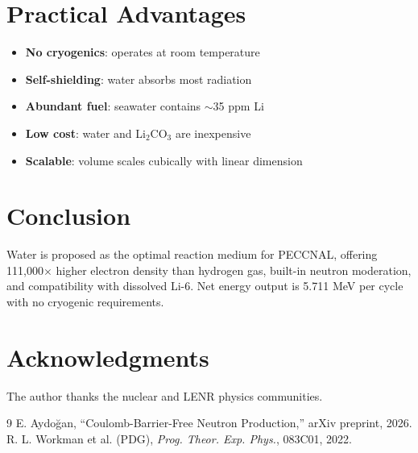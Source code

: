 \documentclass[12pt,a4paper]{article}
\begin{document}
\section{Practical Advantages}

\begin{itemize}
\item \textbf{No cryogenics}: operates at room temperature
\item \textbf{Self-shielding}: water absorbs most radiation
\item \textbf{Abundant fuel}: seawater contains $\sim$35 ppm Li
\item \textbf{Low cost}: water and Li$_2$CO$_3$ are inexpensive
\item \textbf{Scalable}: volume scales cubically with linear dimension
\end{itemize}

\section{Conclusion}
Water is proposed as the optimal reaction medium for PECCNAL,
offering 111,000$\times$ higher electron density than hydrogen gas,
built-in neutron moderation, and compatibility with dissolved Li-6.
Net energy output is 5.711 MeV per cycle with no cryogenic
requirements.

\section*{Acknowledgments}
The author thanks the nuclear and LENR physics communities.

\begin{thebibliography}{9}
 E. Aydoğan, ``Coulomb-Barrier-Free Neutron Production,'' arXiv preprint, 2026.
 R. L. Workman et al. (PDG), \textit{Prog. Theor. Exp. Phys.}, 083C01, 2022.
\end{thebibliography}
\end{document}
